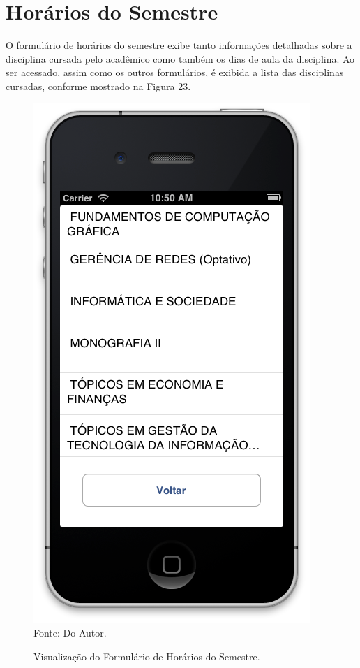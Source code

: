 \section{Horários do Semestre}
O formulário de horários do semestre exibe tanto informações detalhadas sobre a disciplina cursada pelo acadêmico como também os dias de aula da disciplina. Ao ser acessado, assim como os outros formulários, é exibida a lista das disciplinas cursadas, conforme mostrado na Figura 23.
\begin{figure}[!htb]
     \centering
     \caption[Formulário Horários do Semestre - Lista das Disciplinas]{Visualização do Formulário de Horários do Semestre.}
     \includegraphics[scale=0.34]{imagens/formhorariosemestre.png}
     \\  Fonte: Do Autor.
\end{figure}

